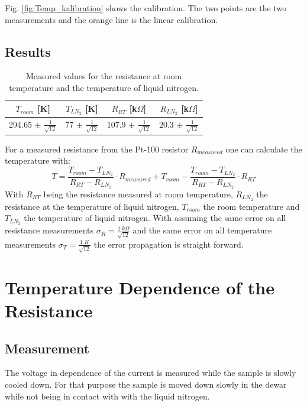 \documentclass[12pt,a4paper]{article}
\begin{document}
Fig. \ref{fig:Temp_kalibration} shows the calibration. The two points are the two measurements and the orange line is the linear calibration. 

\subsection{Results}

\begin{table} [H]
\centering
\begin{tabular}{|c|c|c|c|}
\hline 
$T_{room}$ [K] & $T_{LN_2}$ [K] & $R_{RT}$ [k$\Omega$] & $R_{LN_2}$ [k$\Omega$] \\ 
\hline 
294.65 $\pm$ $\frac{1}{\sqrt{12}}$ & 77 $\pm$ $\frac{1}{\sqrt{12}}$ & 107.9 $\pm$ $\frac{1}{\sqrt{12}}$ & 20.3 $\pm$ $\frac{1}{\sqrt{12}}$ \\ 
\hline 
\end{tabular} 
\caption{Measured values for the resistance at room temperature and the temperature of liquid nitrogen.}
\label{tab:Temp_Calib_data}
\end{table}

For a measured resistance from the Pt-100 resistor $R_{measured}$ one can calculate the temperature with:
\begin{equation*}
T = \dfrac{T_{room} - T_{LN_2}}{R_{RT} - R_{LN_2}} \cdot R_{measured} + T_{room} - \dfrac{T_{room} - T_{LN_2}}{R_{RT} - R_{LN_2}} \cdot R_{RT}
\end{equation*}
With $R_{RT}$ being the resistance measured at room temperature, $R_{LN_2}$ the resistance at the temperature of liquid nitrogen, $T_{room}$ the room temperature and $T_{LN_2}$ the temperature of liquid nitrogen. With assuming the same error on all resistance measurements $\sigma _R = \frac{\SI{1}{k \Omega}}{\sqrt{12}}$ and the same error on all temperature measurements $\sigma _T = \frac{\SI{1}{K}}{\sqrt{12}}$ the error propagation is straight forward.


\section{Temperature Dependence of the Resistance}
\subsection{Measurement}
The voltage in dependence of the current is measured while the sample is slowly cooled down. For that purpose the sample is moved down slowly in the dewar while not being in contact with with the liquid nitrogen.
\end{document}
